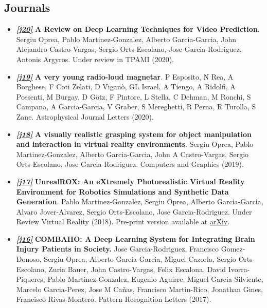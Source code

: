 \documentclass[8pt]{article}
\begin{document}
\subsection*{Journals}

\begin{itemize}
    \item \emph{\textbf{\href{https://arxiv.org/pdf/2004.05214.pdf}{[j20]}}} \textbf{A Review on Deep Learning Techniques for Video Prediction}. Sergiu Oprea, Pablo Martinez-Gonzalez, Alberto Garcia-Garcia, John Alejandro Castro-Vargas, Sergio Orts-Escolano, Jose Garcia-Rodriguez, Antonis Argyros. Under review in TPAMI (2020).
    \item \emph{\textbf{\href{https://arxiv.org/pdf/2004.04083.pdf}{[j19]}}} \textbf{A very young radio-loud magnetar}. P Esposito, N Rea, A Borghese, F Coti Zelati, D Viganò, GL Israel, A Tiengo, A Ridolfi, A Possenti, M Burgay, D Götz, F Pintore, L Stella, C Dehman, M Ronchi, S Campana, A Garcia-Garcia, V Graber, S Mereghetti, R Perna, R Turolla, S Zane. Astrophysical Journal Letters (2020).
    \item \emph{\textbf{\href{https://rua.ua.es/dspace/bitstream/10045/94476/5/2019_Oprea_etal_CompGraph_preprint.pdf}{[j18]}}} \textbf{A visually realistic grasping system for object manipulation and interaction in virtual reality environments}. Sergiu Oprea, Pablo Martinez-Gonzalez, Alberto Garcia-Garcia, John A Castro-Vargas, Sergio Orts-Escolano, Jose Garcia-Rodriguez. Computers and Graphics (2019).
    \item \emph{\textbf{\href{https://arxiv.org/abs/1810.06936}{[j17]}}} \textbf{UnrealROX: An eXtremely Photorealistic Virtual Reality Environment for Robotics Simulations and Synthetic Data Generation}. Pablo Martinez-Gonzalez, Sergiu Oprea, Alberto Garcia-Garcia, Alvaro Jover-Alvarez, Sergio Orts-Escolano, Jose Garcia-Rodriguez. Under Review Virtual Reality (2018). Pre-print version available at {\href{https://arxiv.org/abs/1810.06936}{arXiv}}.
    \item \emph{\textbf{\href{https://www.sciencedirect.com/science/article/pii/S0167865519300534}{[j16]}}} \textbf{COMBAHO: A Deep Learning System for Integrating Brain Injury Patients in Society.} Jose Garcia-Rodriguez, Francisco Gomez-Donoso, Sergiu Oprea, Alberto Garcia-Garcia, Miguel Cazorla, Sergio Orts-Escolano, Zuria Bauer, John Castro-Vargas, Felix Escalona, David Ivorra-Piqueres, Pablo Martinez-Gonzalez, Eugenio Aguirre, Miguel Garcia-Silviente, Marcelo Garcia-Perez, Jose M Cañas, Francisco Martin-Rico, Jonathan Gines, Francisco Rivas-Montero. Pattern Recognition Letters (2017).

\end{itemize}
\end{document}
